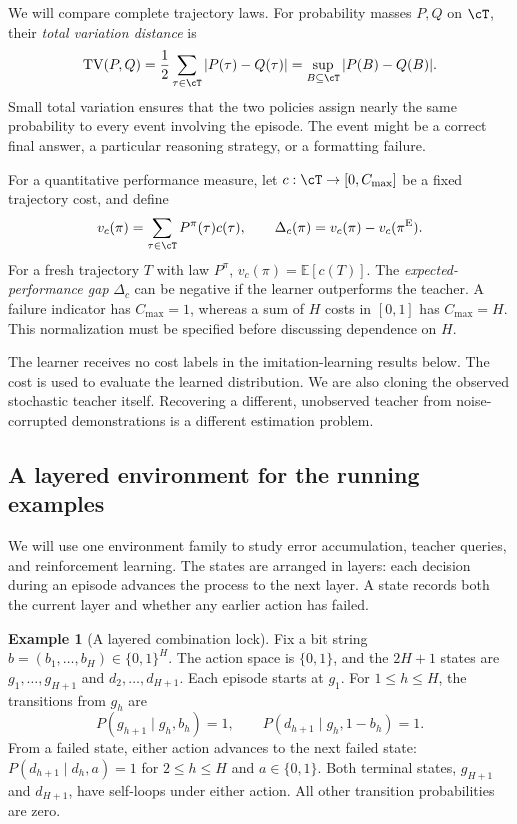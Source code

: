 \documentclass[11pt,twoside]{article}
\newcommand{\E}{\mathbb E}
\newcommand{\TV}{\mathrm{TV}}
\theoremstyle{definition}
\newtheorem{example}[theorem]{Example}
\theoremstyle{remark}
\begin{document}
We will compare complete trajectory laws. For probability masses $P,Q$ on
$\cT$, their \emph{total variation distance} is
\begin{equation}
 \TV(P,Q)=\frac12\sum_{\tau\in\cT}|P(\tau)-Q(\tau)|
          =\sup_{B\subseteq\cT}|P(B)-Q(B)|.
 \label{eq:tv}
\end{equation}
Small total variation ensures that the two policies assign nearly the same
probability to every event involving the episode. The event might be a
correct final answer, a particular reasoning strategy, or a formatting failure.

For a quantitative performance measure, let $c:\cT\to[0,C_{\max}]$ be a
fixed trajectory cost, and define
\begin{equation}
 v_c(\pi)=\sum_{\tau\in\cT}P^\pi(\tau)c(\tau),
 \qquad
 \Delta_c(\pi)=v_c(\pi)-v_c(\pi^{\rm E}).
 \label{eq:cost}
\end{equation}
For a fresh trajectory $T$ with law $P^\pi$, $v_c(\pi)=\E[c(T)]$.
The \emph{expected-performance gap} $\Delta_c$ can be negative if the learner
outperforms the teacher. A failure indicator has $C_{\max}=1$, whereas
a sum of $H$ costs in $[0,1]$ has $C_{\max}=H$.
This normalization must be specified before discussing dependence on $H$.

The learner receives no cost labels in the imitation-learning results below.
The cost is used to evaluate the learned distribution. We are also cloning
the observed stochastic teacher itself. Recovering a different, unobserved
teacher from noise-corrupted demonstrations is a different estimation problem.

\subsection{A layered environment for the running examples}

We will use one environment family to study error accumulation, teacher
queries, and reinforcement learning. The states are arranged in layers:
each decision during an episode advances the process to the next layer.
A state records both
the current layer and whether any earlier action has failed.

\begin{example}[A layered combination lock]
\label{ex:layered}
Fix a bit string $b=(b_1,\ldots,b_H)\in\{0,1\}^H$.
The action space is $\{0,1\}$, and the $2H+1$ states are
$g_1,\ldots,g_{H+1}$ and $d_2,\ldots,d_{H+1}$.
Each episode starts at $g_1$. For $1\le h\le H$, the transitions from
$g_h$ are
\[
 P(g_{h+1}\mid g_h,b_h)=1,\qquad
 P(d_{h+1}\mid g_h,1-b_h)=1.
\]
From a failed state, either action advances to the next failed state:
$P(d_{h+1}\mid d_h,a)=1$ for $2\le h\le H$ and $a\in\{0,1\}$.
Both terminal states, $g_{H+1}$ and $d_{H+1}$, have self-loops under either
action. All other transition probabilities are zero.
\end{example}
\end{document}

